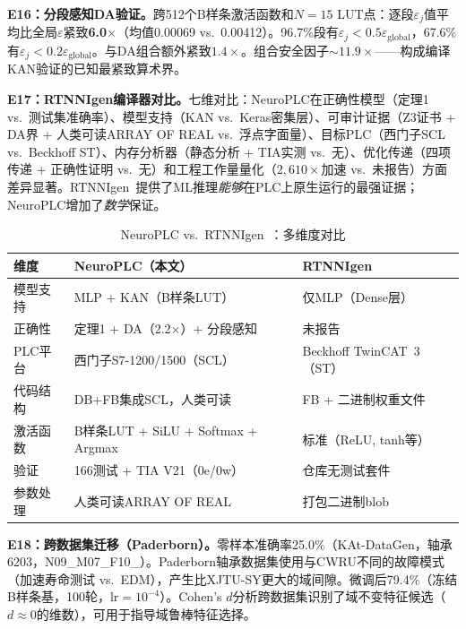 \documentclass[journal,onecolumn]{IEEEtran}
\theoremstyle{definition}
\theoremstyle{plain}
\theoremstyle{remark}
\begin{document}
\noindent\textbf{E16：分段感知DA验证。}跨512个B样条激活函数和$N=15$ LUT点：逐段$\varepsilon_j$值平均比全局$\varepsilon$紧致\textbf{6.0$\times$}（均值0.00069 vs.\ 0.00412）。96.7\%段有$\varepsilon_j < 0.5\varepsilon_{\text{global}}$，67.6\%有$\varepsilon_j < 0.2\varepsilon_{\text{global}}$。与DA组合额外紧致$1.4\times$。组合安全因子$\sim 11.9\times$——构成编译KAN验证的已知最紧致算术界。

\noindent\textbf{E17：RTNNIgen编译器对比。}七维对比：NeuroPLC在正确性模型（定理1 vs.\ 测试集准确率）、模型支持（KAN vs.\ Keras密集层）、可审计证据（Z3证书 + DA界 + 人类可读ARRAY OF REAL vs.\ 浮点字面量）、目标PLC（西门子SCL vs.\ Beckhoff ST）、内存分析器（静态分析 + TIA实测 vs.\ 无）、优化传递（四项传递 + 正确性证明 vs.\ 无）和工程工作量量化（$2{,}610\times$加速 vs.\ 未报告）方面差异显著。RTNNIgen~\cite{rtnnigen2024}提供了ML推理\textit{能够}在PLC上原生运行的最强证据；NeuroPLC增加了\textit{数学}保证。

\begin{table}[!t]
\centering
\caption{NeuroPLC vs.\ RTNNIgen~\cite{rtnnigen2024}：多维度对比}
\label{tab:rtnnigen}
\footnotesize
\begin{tabular}{@{}p{1.9cm}p{2.9cm}p{2.9cm}@{}}
\toprule
\textbf{维度} & \textbf{NeuroPLC（本文）} & \textbf{RTNNIgen} \\
\midrule
模型支持 & MLP + KAN（B样条LUT） & 仅MLP（Dense层） \\
\addlinespace
正确性 & 定理1 + DA（2.2$\times$）+ 分段感知 & 未报告 \\
\addlinespace
PLC平台 & 西门子S7-1200/1500（SCL） & Beckhoff TwinCAT~3（ST） \\
\addlinespace
代码结构 & DB+FB集成SCL，人类可读 & FB + 二进制权重文件 \\
\addlinespace
激活函数 & B样条LUT + SiLU + Softmax + Argmax & 标准（ReLU, tanh等） \\
\addlinespace
验证 & 166测试 + TIA V21（0e/0w） & 仓库无测试套件 \\
\addlinespace
参数处理 & 人类可读ARRAY OF REAL & 打包二进制blob \\
\bottomrule
\end{tabular}
\end{table}

\noindent\textbf{E18：跨数据集迁移（Paderborn）。}零样本准确率25.0\%（KAt-DataGen，轴承6203，N09\_M07\_F10\_）。Paderborn轴承数据集使用与CWRU不同的故障模式（加速寿命测试 vs.\ EDM），产生比XJTU-SY更大的域间隙。微调后79.4\%（冻结B样条基，100轮，lr$=10^{-4}$）。Cohen's $d$分析跨数据集识别了域不变特征候选（$d \approx 0$的维数），可用于指导域鲁棒特征选择。
\end{document}

